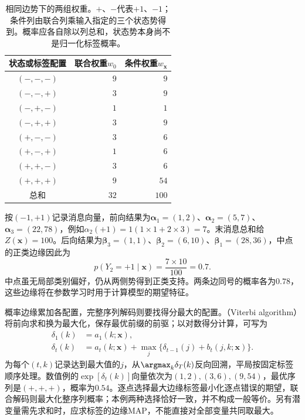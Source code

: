 \begin{table}[htbp]
  \centering
  \begin{tabular}{crr}
    \toprule
    状态或标签配置 & 联合权重$w_0$ & 条件权重$w_{\bm{x}}$\\
    \midrule
    $(-,-,-)$ & $9$ & $9$\\
    $(-,-,+)$ & $3$ & $9$\\
    $(-,+,-)$ & $1$ & $1$\\
    $(-,+,+)$ & $3$ & $9$\\
    $(+,-,-)$ & $3$ & $6$\\
    $(+,-,+)$ & $1$ & $6$\\
    $(+,+,-)$ & $3$ & $6$\\
    $(+,+,+)$ & $9$ & $54$\\
    \midrule
    总和 & $32$ & $100$\\
    \bottomrule
  \end{tabular}
  \caption{相同边势下的两组权重。$+$、$-$代表$+1$、$-1$；条件列由联合列乘输入指定的三个状态势得到。概率应各自除以列总和，状态势本身尚不是归一化标签概率。}
  \label{tab:pgm-energy-models-chain-weights}
\end{table}

按$(-1,+1)$记录消息向量，前向结果为$\bm{\alpha}_1=(1,2)$、$\bm{\alpha}_2=(5,7)$、$\bm{\alpha}_3=(22,78)$，例如$\alpha_2(+1)=1(1\times1+2\times3)=7$。末消息总和给$Z(\bm{x})=100$。后向结果为$\bm{\beta}_3=(1,1)$、$\bm{\beta}_2=(6,10)$、$\bm{\beta}_1=(28,36)$，中点的正类边缘因此为
\[
  p(Y_2=+1\mid\bm{x})=\frac{7\times10}{100}=0.7.
\]
中点虽无局部类别偏好，仍从两侧势得到正类支持。两条边同号的概率各为$0.78$，这些边缘将在参数学习时用于计算模型的期望特征。

概率边缘累加各配置，完整序列解码则要找得分最大的配置。（Viterbi algorithm）将前向求和换为最大化，保存最优前缀的前驱；以对数得分计算，可写为
\begin{equation}
  \begin{aligned}
    \delta_1(k)&=a_1(k;\bm{x}),\\
    \delta_t(k)&=a_t(k;\bm{x})
       +\max_j\{\delta_{t-1}(j)+b_t(j,k;\bm{x})\}.
  \end{aligned}
  \label{eq:pgm-energy-models-viterbi}
\end{equation}
为每个$(t,k)$记录达到最大值的$j$，从$\argmax_k\delta_T(k)$反向回溯，平局按固定标签顺序处理。数值例的$\exp[\delta_t(k)]$向量依次为$(1,2),(3,6),(9,54)$，最优序列是$(+,+,+)$，概率为$0.54$。逐点选择最大边缘标签最小化逐点错误的期望，联合解码则最大化整序列概率；本例两种选择恰好一致，并不构成一般等价。另有潜变量需先求和时，应求标签的边缘MAP，不能直接对全部变量共同取最大。

